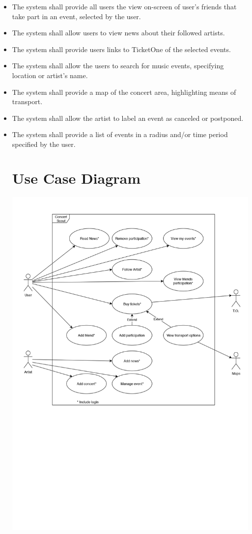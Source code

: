\documentclass[11pt,a4paper]{article}
\begin{document}
\begin{itemize}
\item The system shall provide all users the view on-screen of user’s friends that take part in an event, selected by the user.
\item The system shall allow users to view news about their followed artists.
\item The system shall provide users links to TicketOne of the selected events.
\item The system shall allow the users to search for music events, specifying location or artist’s name.
\item The system shall provide a map of the concert area, highlighting means of transport.
\item The system shall allow the artist to label an event as canceled or postponed.
\item The system shall provide a list of events in a radius and/or time period specified by the user.
\section{Use Case Diagram}
\includegraphics[scale=0.7]{UseCaseFinal.jpg}

\end{itemize}
\end{document}
